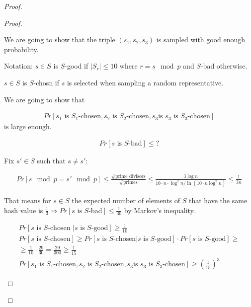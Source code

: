\begin{proof}
\begin{proof}
\begin{enumerate}
		We are going to show that the triple $(s_1, s_2, s_3)$ is sampled with good enough probability.

		Notation: $s \in S$ is $S$-good if $|S_r| \leq 10$ where $r = s \mod p$ and $S$-bad otherwise.

		$s \in S$ is $S$-chosn if $s$ is selected when sampling a random representative.

		We are going to show that 

		\begin{align*}
		  Pr[s_1 \text{ is }S_1\text{-chosen}, s_2 \text{ is }S_2\text{-chosen}, s_3 \text{is } s_3\text{ is } S_3\text{-chosen}]
		\end{align*}
		is large enough.

		\begin{align*}
		  Pr[s \text{ is }S\text{-bad}] \leq ?
		\end{align*}

		Fix $s' \in S$ such that $s \neq s'$:

		\begin{align*}
		  Pr[s \mod p = s' \mod p] \leq \frac{\text{\# prime divisors}}{\text{\# primes}} \leq \frac{3\log n}{10 \cdot n \cdot \log^2 n / \ln(10 \cdot n \log^2 n)} \leq \frac{1}{3 n}
		\end{align*}

		That means for $s \in S$ the expected number of elements of $S$ that have the same hash value is $\frac{1}{3} \Longrightarrow Pr[s \text{ is } S\text{-bad}] \leq \frac{1}{30}$ by Markov's inequality.


		\begin{align*}
		  Pr[s \text{ is } S\text{-chosen } | s \text{ is  } S\text{-good}] \geq \frac{1}{10} \\
		  Pr[s \text { is } S\text{-chosen}] \geq Pr[s \text{ is } S\text{-chosen} | s \text{ is } S\text{-good}] \cdot Pr[s \text { is } S\text{-good}] \geq \\
		  \geq \frac{1}{10} \cdot \frac{29}{30} = \frac{29}{300} \geq \frac{1}{15} \\
		  Pr[s_1 \text{ is }S_1\text{-chosen}, s_2 \text{ is }S_2\text{-chosen}, s_3 \text{is } s_3\text{ is } S_3\text{-chosen}] \geq \left(\frac{1}{15}\right)^{3}
		\end{align*}

	\end{enumerate}
  \end{proof}



\end{proof}

